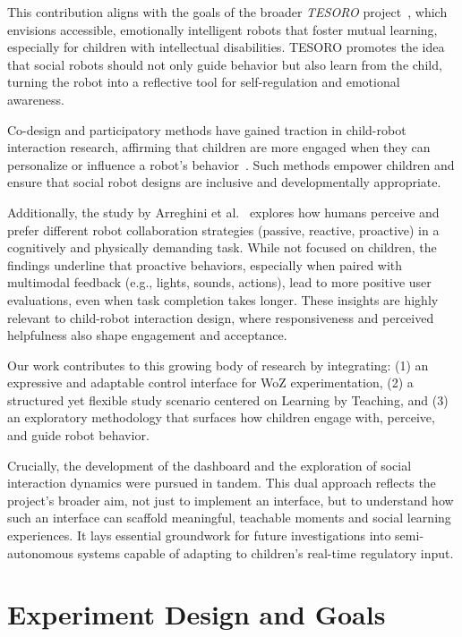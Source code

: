 \documentclass[a4paper]{usiinfbachelorproject}
\begin{document}
This contribution aligns with the goals of the broader \textit{TESORO} project~\cite{landoni2025tesoro}, which envisions accessible, emotionally intelligent robots that foster mutual learning, especially for children with intellectual disabilities.
TESORO promotes the idea that social robots should not only guide behavior but also learn from the child, turning the robot into a reflective tool for self-regulation and emotional awareness.

Co-design and participatory methods have gained traction in child-robot interaction research, affirming that children are more engaged when they can personalize or influence a robot's behavior~\cite{osti_10386132, rose2019participatory}.
Such methods empower children and ensure that social robot designs are inclusive and developmentally appropriate.

Additionally, the study by Arreghini et al.~\cite{arreghini2022exploring} explores how humans perceive and prefer different robot collaboration strategies (passive, reactive, proactive) in a cognitively and physically demanding task.
While not focused on children, the findings underline that proactive behaviors, especially when paired with multimodal feedback (e.g., lights, sounds, actions), lead to more positive user evaluations, even when task completion takes longer.
These insights are highly relevant to child-robot interaction design, where responsiveness and perceived helpfulness also shape engagement and acceptance.

Our work contributes to this growing body of research by integrating:
(1) an expressive and adaptable control interface for WoZ experimentation,
(2) a structured yet flexible study scenario centered on Learning by Teaching, and
(3) an exploratory methodology that surfaces how children engage with, perceive, and guide robot behavior.

Crucially, the development of the dashboard and the exploration of social interaction dynamics were pursued in tandem.
This dual approach reflects the project's broader aim, not just to implement an interface, but to understand how such an interface can scaffold meaningful, teachable moments and social learning experiences.
It lays essential groundwork for future investigations into semi-autonomous systems capable of adapting to children's real-time regulatory input.

\section{\textbf{Experiment Design and Goals}}\label{sec:design}
\end{document}
